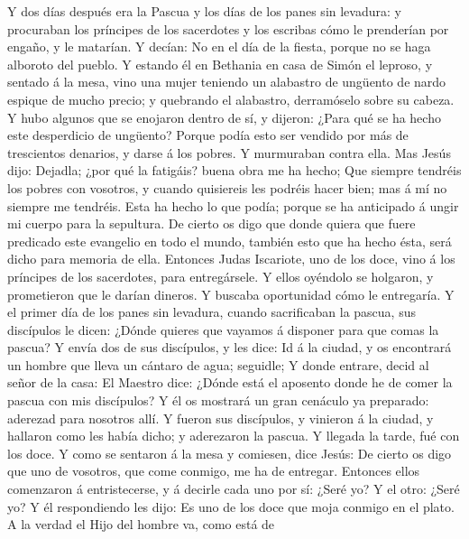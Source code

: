  Y dos días después era la Pascua y los días de los panes
sin levadura: y procuraban los príncipes de los sacerdotes y los
escribas cómo le prenderían por engaño, y le matarían.  Y
decían: No en el día de la fiesta, porque no se haga alboroto del
pueblo.  Y estando él en Bethania en casa de Simón el
leproso, y sentado á la mesa, vino una mujer teniendo un alabastro de
ungüento de nardo espique de mucho precio; y quebrando el alabastro,
derramóselo sobre su cabeza.  Y hubo algunos que se
enojaron dentro de sí, y dijeron: ¿Para qué se ha hecho este desperdicio
de ungüento?  Porque podía esto ser vendido por más de
trescientos denarios, y darse á los pobres. Y murmuraban contra ella.
 Mas Jesús dijo: Dejadla; ¿por qué la fatigáis? buena obra
me ha hecho;  Que siempre tendréis los pobres con
vosotros, y cuando quisiereis les podréis hacer bien; mas á mí no
siempre me tendréis.  Esta ha hecho lo que podía; porque
se ha anticipado á ungir mi cuerpo para la sepultura.  De
cierto os digo que donde quiera que fuere predicado este evangelio en
todo el mundo, también esto que ha hecho ésta, será dicho para memoria
de ella.  Entonces Judas Iscariote, uno de los doce, vino
á los príncipes de los sacerdotes, para entregársele.  Y
ellos oyéndolo se holgaron, y prometieron que le darían dineros. Y
buscaba oportunidad cómo le entregaría.  Y el primer día
de los panes sin levadura, cuando sacrificaban la pascua, sus discípulos
le dicen: ¿Dónde quieres que vayamos á disponer para que comas la
pascua?  Y envía dos de sus discípulos, y les dice: Id á
la ciudad, y os encontrará un hombre que lleva un cántaro de agua;
seguidle;  Y donde entrare, decid al señor de la casa: El
Maestro dice: ¿Dónde está el aposento donde he de comer la pascua con
mis discípulos?  Y él os mostrará un gran cenáculo ya
preparado: aderezad para nosotros allí.  Y fueron sus
discípulos, y vinieron á la ciudad, y hallaron como les había dicho; y
aderezaron la pascua.  Y llegada la tarde, fué con los
doce.  Y como se sentaron á la mesa y comiesen, dice
Jesús: De cierto os digo que uno de vosotros, que come conmigo, me ha de
entregar.  Entonces ellos comenzaron á entristecerse, y á
decirle cada uno por sí: ¿Seré yo? Y el otro: ¿Seré yo? 
Y él respondiendo les dijo: Es uno de los doce que moja conmigo en el
plato.  A la verdad el Hijo del hombre va, como está de
